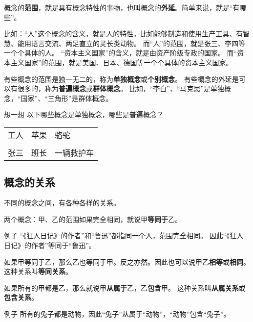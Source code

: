 \documentclass[12pt,UTF8,a4paper]{article}
\begin{document}
概念的\textbf{范围}，就是具有概念特性的事物，也叫概念的\textbf{外延}。简单来说，就是“有哪些”。

比如：“人”这个概念的含义，就是人的特性，比如能够制造和使用生产工具、有智慧、能用语言交流、两足直立的灵长类动物。
而“人”的范围，就是张三、李四等一个个具体的人。
“资本主义国家”的含义，就是由资产阶级专政的国家。
而“资本主义国家”的范围，就是美国、日本、德国等一个个具体的资本主义国家。

有些概念的范围是独一无二的，称为\textbf{单独概念}或\textbf{个别概念}。
有些概念的外延是可以有很多的，称为\textbf{普遍概念}或\textbf{群体概念}。
比如，“李白”、“马克思”是单独概念，“国家”、“三角形”是群体概念。

\begin{blockaft}{想一想}
    以下哪些概念是单独概念，哪些是普遍概念？\\
    \begin{center}
        \begin{tabular}{p{8em}<{\centering} p{8em}<{\centering} p{8em}<{\centering} }
            工人 & 苹果 & 骆驼 \\
            & & \\
            张三 & 班长 & 一辆救护车\\
        \end{tabular}
    \end{center}
\end{blockaft}

\subsection{概念的关系}

不同的概念之间，有各种各样的关系。

两个概念：甲、乙的范围如果完全相同，就说甲\textbf{等同于}乙。

\begin{blockin}{例子}
    “《狂人日记》的作者”和“鲁迅”都指同一个人，范围完全相同。
    因此“《狂人日记》的作者”等同于“鲁迅”。
\end{blockin}

如果甲等同于乙，那么乙也等同于甲。反之亦然。因此也可以说甲乙\textbf{相等}或\textbf{相同}。
这种关系叫\textbf{等同关系}。

如果所有的甲都是乙，那么就说甲\textbf{从属于}乙，乙\textbf{包含}甲。
这种关系叫\textbf{从属关系}或\textbf{包含关系}。

\begin{blockin}{例子}
    所有的兔子都是动物，因此“兔子”从属于“动物”，“动物”包含“兔子”。 
\end{blockin}
\end{document}
